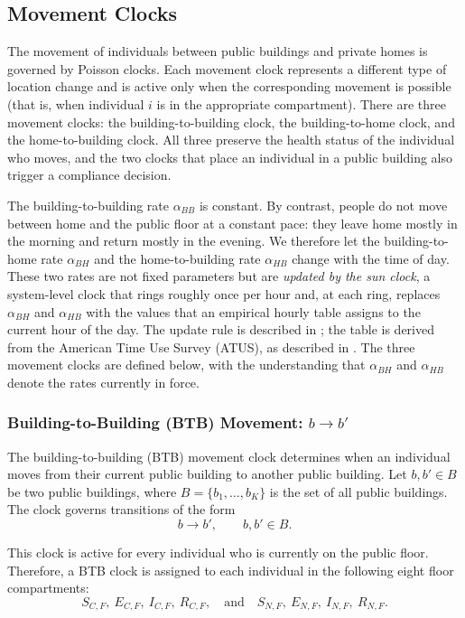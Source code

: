 \documentclass[11pt]{article}
\theoremstyle{definition}
\theoremstyle{plain}
\begin{document}
\subsection{Movement Clocks}
\label{sec:movement}

The movement of individuals between public buildings and private homes is governed by Poisson clocks. Each movement clock represents a different type of location change and is active only when the corresponding movement is possible (that is, when individual $i$ is in the appropriate compartment).
There are three movement clocks: the building-to-building clock, the building-to-home clock, and the home-to-building clock. All three preserve the health status of the individual who moves, and the two clocks that place an individual in a public building also trigger a compliance decision.

The building-to-building rate $\alpha_{BB}$ is constant. By contrast, people do not move between home and the public floor at a constant pace: they leave home mostly in the morning and return mostly in the evening. We therefore let the building-to-home rate $\alpha_{BH}$ and the home-to-building rate $\alpha_{HB}$ change with the time of day. These two rates are not fixed parameters but are \emph{updated by the sun clock}, a system-level clock that rings roughly once per hour and, at each ring, replaces $\alpha_{BH}$ and $\alpha_{HB}$ with the values that an empirical hourly table assigns to the current hour of the day. The update rule is described in ; the table is derived from the American Time Use Survey (ATUS), as described in . The three movement clocks are defined below, with the understanding that $\alpha_{BH}$ and $\alpha_{HB}$ denote the rates currently in force.

\subsubsection{Building-to-Building (BTB) Movement: \texorpdfstring{$b\rightarrow b'$}{b to b'}}
\label{sec:btb}

The building-to-building (BTB) movement clock determines when an individual moves from their current public building to another public building. Let $b,b'\in B$ be two public buildings, where $B=\{b_1,\ldots,b_K\}$ is the set of all public buildings. The clock governs transitions of the form
\[
b\longrightarrow b',
\qquad b,b' \in B.
\]

This clock is active for every individual who is currently on the public floor. Therefore, a BTB clock is assigned to each individual in the following eight floor compartments:
\[
S_{C,F},\ E_{C,F},\ I_{C,F},\ R_{C,F},
\quad\text{and}\quad
S_{N,F},\ E_{N,F},\ I_{N,F},\ R_{N,F}.
\]
\end{document}
